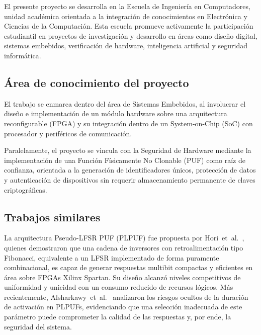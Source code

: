 El presente proyecto se desarrolla en la Escuela de Ingeniería en Computadores, unidad
académica orientada a la integración de conocimientos en Electrónica y Ciencias de la
Computación. Esta escuela promueve activamente la participación estudiantil en proyectos
de investigación y desarrollo en áreas como diseño digital, sistemas embebidos,
verificación de hardware, inteligencia artificial y seguridad informática.

\subsection{Área de conocimiento del proyecto}

El trabajo se enmarca dentro del área de Sistemas Embebidos, al involucrar el diseño e
implementación de un módulo hardware sobre una arquitectura reconfigurable (FPGA) y su
integración dentro de un System-on-Chip (SoC) con procesador y periféricos de
comunicación.

Paralelamente, el proyecto se vincula con la Seguridad de Hardware mediante la
implementación de una Función Físicamente No Clonable (PUF) como raíz de confianza,
orientada a la generación de identificadores únicos, protección de datos y autenticación
de dispositivos sin requerir almacenamiento permanente de claves criptográficas.

\subsection{Trabajos similares}

La arquitectura Pseudo-LFSR PUF (PLPUF) fue propuesta por
Hori~et~al.~\cite{hori_2011_pseudolfsr}, quienes demostraron que una cadena
de inversores con retroalimentación tipo Fibonacci, equivalente a un LFSR
implementado de forma puramente combinacional, es capaz de generar respuestas
multibit compactas y eficientes en área sobre FPGAs Xilinx Spartan. Su
diseño alcanzó niveles competitivos de uniformidad y unicidad con un consumo
reducido de recursos lógicos. Más recientemente,
Alsharkawy~et~al.~\cite{alsharkawy_2024_plpufs} analizaron los riesgos
ocultos de la duración de activación en PLPUFs, evidenciando que una
selección inadecuada de este parámetro puede comprometer la calidad de las
respuestas y, por ende, la seguridad del sistema.

